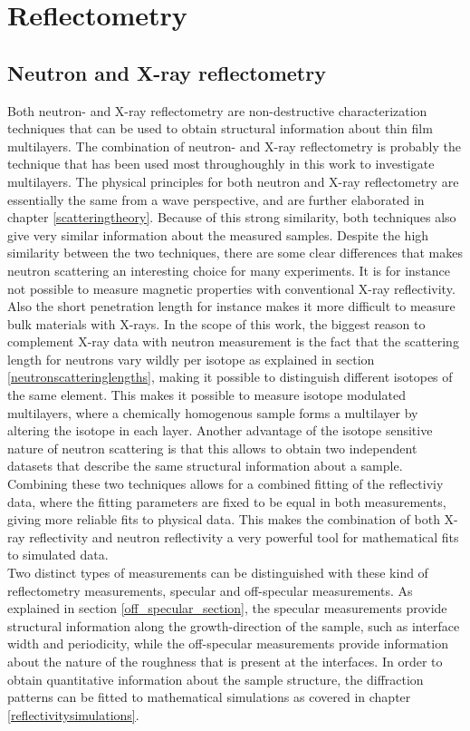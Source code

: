 \chapter{Reflectometry}\label{instrumentalaspects}
\section{Neutron and X-ray reflectometry}
Both neutron- and X-ray reflectometry are non-destructive characterization techniques that can be used to obtain structural information about thin film multilayers. 
The combination of neutron- and X-ray reflectometry is probably the technique that has been used most throughoughly in this work to investigate multilayers. The physical principles for both neutron and X-ray reflectometry are essentially the same from a wave perspective, and are further elaborated in chapter \ref{scatteringtheory}. Because of this strong similarity, both techniques also give very similar information about the measured samples. Despite the high similarity between the two techniques, there are some clear differences that makes neutron scattering an interesting choice for many experiments. It is for instance not possible to measure magnetic properties with conventional X-ray reflectivity. Also the short penetration length for instance makes it more difficult to measure bulk materials with X-rays. In the scope of this work, the biggest reason to complement X-ray data with neutron measurement is the fact that the scattering length for neutrons vary wildly per isotope as explained in section \ref{neutronscatteringlengths}, making it possible to distinguish different isotopes of the same element. This makes it possible to measure isotope modulated multilayers, where a chemically homogenous sample forms a multilayer by altering the isotope in each layer. Another advantage of the isotope sensitive nature of neutron scattering is that this allows to obtain two independent datasets that describe the same structural information about a sample. Combining these two techniques allows for a combined fitting of the reflectiviy data, where the fitting parameters are fixed to be equal in both measurements, giving more reliable fits to physical data. This makes the combination of both X-ray reflectivity and neutron reflectivity a very powerful tool for mathematical fits to simulated data.\\
Two distinct types of measurements can be distinguished with these kind of reflectometry measurements, specular and off-specular measurements. As explained in section \ref{off_specular_section}, the specular measurements provide structural information along the growth-direction of the sample, such as interface width and periodicity, while the off-specular measurements provide information about the nature of the roughness that is present at the interfaces. In order to obtain quantitative information about the sample structure, the diffraction patterns can be fitted to mathematical simulations as covered in chapter \ref{reflectivitysimulations}. 
